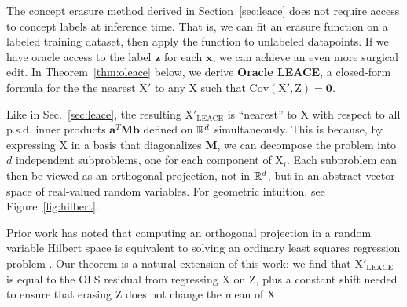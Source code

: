 \documentclass{article}
\theoremstyle{plain}
\theoremstyle{remark}
\newcommand{\R}{\mathbb{R}}
\newcommand{\xx}{\boldsymbol{x}}
\newcommand{\zz}{\boldsymbol{z}}
\theoremstyle{plain}
\theoremstyle{TheoremNum}
\newcommand{\rv}[1]{{\mathrm{#1}}}
\renewcommand{\R}{{\color{black} \mathbb{R}}}
\begin{document}
The concept erasure method derived in Section~\ref{sec:leace} does not require access to concept labels at inference time. That is, we can fit an erasure function on a labeled training dataset, then apply the function to unlabeled datapoints. If we have oracle access to the label $\zz$ for each $\xx$, we can achieve an even more surgical edit. In Theorem~\ref{thm:oleace} below, we derive \textbf{Oracle LEACE}, a closed-form formula for the the nearest $\rv X'$ to any $\rv X$ such that $\mathrm{Cov}(\rv X', \rv Z) = \textbf{0}$.

Like in Sec.~\ref{sec:leace}, the resulting $\rv X'_{\mathrm{LEACE}}$ is ``nearest'' to $\rv X$ with respect to all p.s.d. inner products $\mathbf a^T \mathbf{Mb}$ defined on $\R^d$ simultaneously. This is because, by expressing $\rv X$ in a basis that diagonalizes $\mathbf M$, we can decompose the problem into $d$ independent subproblems, one for each component of $\rv X_i$. Each subproblem can then be viewed as an orthogonal projection, not in $\R^d$, but in an abstract vector space of real-valued random variables. For geometric intuition, see Figure~\ref{fig:hilbert}.

Prior work has noted that computing an orthogonal projection in a random variable Hilbert space is equivalent to solving an ordinary least squares regression problem \cite{berkeley2018hilbert}. Our theorem is a natural extension of this work: we find that $\rv X'_{\mathrm{LEACE}}$ is equal to the OLS residual from regressing $\rv X$ on $\rv Z$, plus a constant shift needed to ensure that erasing $\rv Z$ does not change the mean of $\rv X$.
\end{document}
